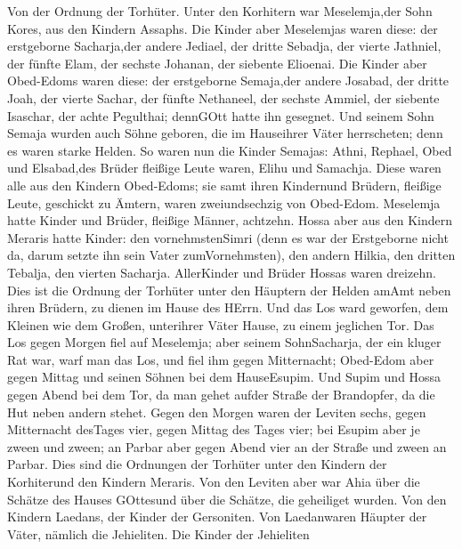  Von der Ordnung der Torhüter. Unter den Korhitern war
Meselemja,der Sohn Kores, aus den Kindern Assaphs.  Die
Kinder aber Meselemjas waren diese: der erstgeborne Sacharja,der andere
Jediael, der dritte Sebadja, der vierte Jathniel,  der
fünfte Elam, der sechste Johanan, der siebente Elioenai. 
Die Kinder aber Obed-Edoms waren diese: der erstgeborne Semaja,der
andere Josabad, der dritte Joah, der vierte Sachar, der fünfte
Nethaneel,  der sechste Ammiel, der siebente Isaschar, der
achte Pegulthai; dennGOtt hatte ihn gesegnet.  Und seinem
Sohn Semaja wurden auch Söhne geboren, die im Hauseihrer Väter
herrscheten; denn es waren starke Helden.  So waren nun die
Kinder Semajas: Athni, Rephael, Obed und Elsabad,des Brüder fleißige
Leute waren, Elihu und Samachja.  Diese waren alle aus den
Kindern Obed-Edoms; sie samt ihren Kindernund Brüdern, fleißige Leute,
geschickt zu Ämtern, waren zweiundsechzig von Obed-Edom. 
Meselemja hatte Kinder und Brüder, fleißige Männer, achtzehn.
 Hossa aber aus den Kindern Meraris hatte Kinder: den
vornehmstenSimri (denn es war der Erstgeborne nicht da, darum setzte ihn
sein Vater zumVornehmsten),  den andern Hilkia, den dritten
Tebalja, den vierten Sacharja. AllerKinder und Brüder Hossas waren
dreizehn.  Dies ist die Ordnung der Torhüter unter den
Häuptern der Helden amAmt neben ihren Brüdern, zu dienen im Hause des
HErrn.  Und das Los ward geworfen, dem Kleinen wie dem
Großen, unterihrer Väter Hause, zu einem jeglichen Tor. 
Das Los gegen Morgen fiel auf Meselemja; aber seinem SohnSacharja, der
ein kluger Rat war, warf man das Los, und fiel ihm gegen Mitternacht;
 Obed-Edom aber gegen Mittag und seinen Söhnen bei dem
HauseEsupim.  Und Supim und Hossa gegen Abend bei dem Tor,
da man gehet aufder Straße der Brandopfer, da die Hut neben andern
stehet.  Gegen den Morgen waren der Leviten sechs, gegen
Mitternacht desTages vier, gegen Mittag des Tages vier; bei Esupim aber
je zween und zween;  an Parbar aber gegen Abend vier an der
Straße und zween an Parbar.  Dies sind die Ordnungen der
Torhüter unter den Kindern der Korhiterund den Kindern Meraris.
 Von den Leviten aber war Ahia über die Schätze des Hauses
GOttesund über die Schätze, die geheiliget wurden.  Von den
Kindern Laedans, der Kinder der Gersoniten. Von Laedanwaren Häupter der
Väter, nämlich die Jehieliten.  Die Kinder der Jehieliten
